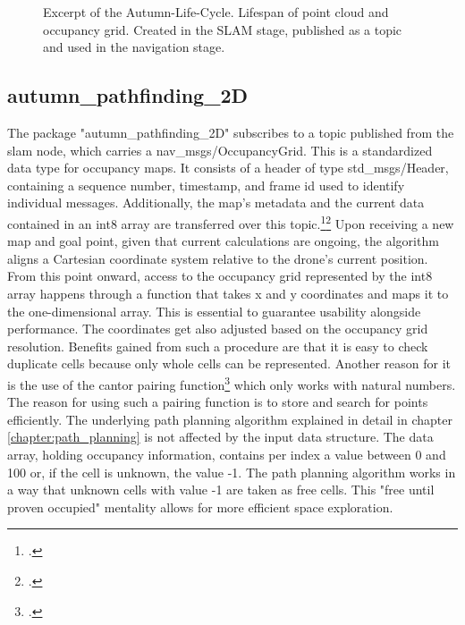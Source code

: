 \begin{figure}[h]
	\centering
	
	\caption{Excerpt of the Autumn-Life-Cycle. Lifespan of point cloud and occupancy grid. Created in the SLAM stage, published as a topic and used in the navigation stage.}
	\label{fig:abstract_environments_enviromentTransfer}
\end{figure}

\subsection{autumn\_pathfinding\_2D}
The package "autumn\_pathfinding\_2D" subscribes to a topic published from the slam node, which carries a nav\_msgs/OccupancyGrid. This is a standardized data type for occupancy maps. It consists of a header of type std\_msgs/Header, containing a sequence number, timestamp, and frame id used to identify individual messages. Additionally, the map's metadata and the current data contained in an int8 array are transferred over this topic.\footcite{rosNavMsgsOccupancyGrid2021}\footcite{rosStdMsgsHeader2021}\newline
Upon receiving a new map and goal point, given that current calculations are ongoing, the algorithm aligns a Cartesian coordinate system relative to the drone's current position. From this point onward, access to the occupancy grid represented by the int8 array happens through a function that takes x and y coordinates and maps it to the one-dimensional array. This is essential to guarantee usability alongside performance.\newline
The coordinates get also adjusted based on the occupancy grid resolution. Benefits gained from such a procedure are that it is easy to check duplicate cells because only whole cells can be represented. Another reason for it is the use of the cantor pairing function\footcite{Szudzik2017} which only works with natural numbers. The reason for using such a pairing function is to store and search for points efficiently.  
The underlying path planning algorithm explained in detail in chapter \ref{chapter:path_planning} is not affected by the input data structure.       
The data array, holding occupancy information, contains per index a value between 0 and 100 or, if the cell is unknown, the value -1. The path planning algorithm works in a way that unknown cells with value -1 are taken as free cells. This "free until proven occupied" mentality allows for more efficient space exploration.

